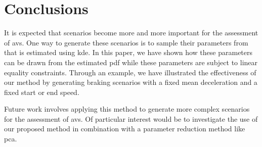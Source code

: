 \section{Conclusions}
\label{sec:conclusions}

It is expected that scenarios become more and more important for the assessment of \acp{av}. 
One way to generate these scenarios is to sample their parameters from  that is estimated using \ac{kde}. 
In this paper, we have shown how these parameters can be drawn from the estimated \ac{pdf} while these parameters are subject to linear equality constraints. 
Through an example, we have illustrated the effectiveness of our method by generating braking scenarios with a fixed mean deceleration and a fixed start or end speed. 

Future work involves applying this method to generate more complex scenarios for the assessment of \acp{av}.
Of particular interest would be to investigate the use of our proposed method in combination with a parameter reduction method like \ac{pca}. 
